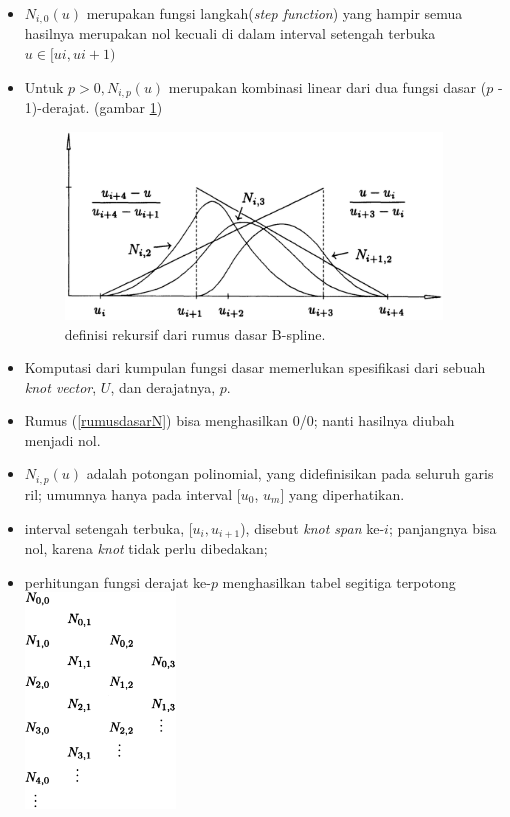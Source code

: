 \begin{itemize}
	\item $N_{i,0}(u)$ merupakan fungsi langkah(\textit{step function})
	yang hampir semua hasilnya merupakan nol kecuali 
	di dalam interval setengah terbuka $u \in [ui, u{i+1})$
	\item Untuk $p > 0, N_{i,p}(u)$ merupakan kombinasi 
	linear dari dua fungsi dasar ($p$ - 1)-derajat. 
	(gambar \ref{gambar:definisirumusdasar})
	\begin{figure}[H]
		\centering
		\includegraphics[keepaspectratio, width=10cm]{gambar/Interpolasi/pic3.png}
		\caption{definisi rekursif dari rumus dasar B-spline.}
		\label{gambar:definisirumusdasar}
	\end{figure}
	\item Komputasi dari kumpulan fungsi dasar 
	memerlukan spesifikasi dari sebuah \textit{knot vector}, 
	$U$, dan derajatnya, $p$.
	\item Rumus (\ref{rumusdasarN}) bisa menghasilkan 0/0; 
	nanti hasilnya diubah menjadi nol.
	\item $N_{i,p}(u)$ adalah potongan polinomial, 
	yang didefinisikan pada seluruh garis ril; umumnya 
	hanya pada interval [$u_0$, $u_m$] yang diperhatikan.
	\item interval setengah terbuka, [$u_i, u_{i+1}$), disebut 
	\textit{knot span} ke-$i$; panjangnya bisa nol, 
	karena \textit{knot} tidak perlu dibedakan;
	\item perhitungan fungsi derajat ke-$p$ 
	menghasilkan tabel segitiga terpotong \\
	\includegraphics[keepaspectratio, width=4cm]{gambar/Interpolasi/pic4.png}
\end{itemize}

